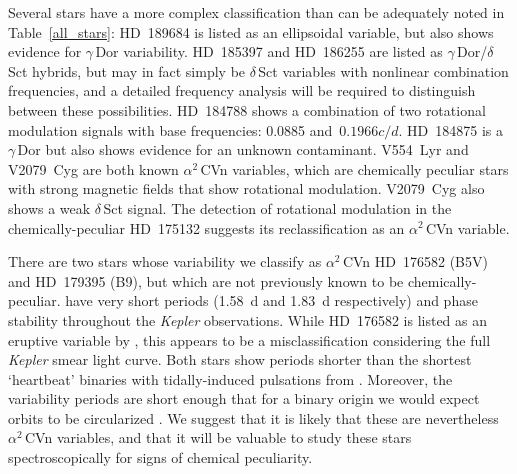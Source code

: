 \documentclass[a4paper,fleqn,usenatbib]{mnras}
\newcommand{\kepler}{\emph{Kepler}\xspace}
\begin{document}
Several stars have a more complex classification than can be adequately noted in Table~\ref{all_stars}: HD~189684 is listed as an ellipsoidal variable, but also shows evidence for $\gamma$\,Dor variability. HD~185397 and HD~186255 are listed as $\gamma$\,Dor/$\delta$\,Sct hybrids, but may in fact simply be $\delta$\,Sct variables with nonlinear combination frequencies, and a detailed frequency analysis will be required to distinguish between these possibilities. HD~184788 shows a combination of two rotational modulation signals with base frequencies: 0.0885 and~$0.1966 c/d$. HD~184875 is a $\gamma$\,Dor but also shows evidence for an unknown contaminant. V554~Lyr and V2079~Cyg are both known $\alpha^2$\,CVn variables, which are chemically peculiar stars with strong magnetic fields that show rotational modulation. V2079~Cyg also shows a weak $\delta$\,Sct signal. The detection of rotational modulation in the chemically-peculiar HD~175132 suggests its reclassification as an $\alpha^2$\,CVn variable. 

There are two stars whose variability we classify as $\alpha^2$\,CVn  HD~176582 (B5V) and HD~179395 (B9), but which are not previously known to be chemically-peculiar. have very short periods (1.58~d and 1.83~d respectively) and phase stability throughout the \kepler observations. While HD~176582 is listed as an eruptive variable by \citet{2016ApJ...829...23D}, this appears to be a misclassification considering the full \kepler smear light curve. Both stars show periods shorter than the shortest `heartbeat' binaries with tidally-induced pulsations from \citet{2012ApJ...753...86T}. Moreover, the variability periods are short enough that for a binary origin we would expect orbits to be circularized \citep{2000A&A...354..881D}. We suggest that it is likely that these are nevertheless $\alpha^2$\,CVn variables, and that it will be valuable to study these stars spectroscopically for signs of chemical peculiarity.
\end{document}
